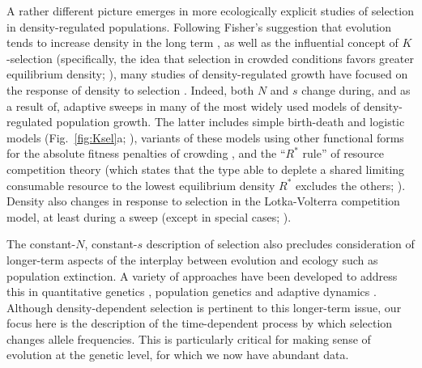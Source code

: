 \documentclass[12pt]{article}
\begin{document}
A rather different picture emerges in more ecologically explicit studies of selection in density-regulated populations. Following Fisher's suggestion that evolution tends to increase density in the long term \citep{fisher_1930, leon_1978, lande_2009}, as well as the influential concept of $K$-selection (specifically, the idea that selection in crowded conditions favors greater equilibrium density; \citealt{macarthur_1962}), many studies of density-regulated growth have focused on the response of density to selection \citep{kostitzin_1939,macarthur_1967,roughgarden_1979,christiansen_2004}. Indeed, both $N$ and $s$ change during, and as a result of, adaptive sweeps in many of the most widely used models of density-regulated population growth. The latter includes simple birth-death \citep{kostitzin_1939} and logistic models (Fig.~\ref{fig:Ksel}a; \citealt{macarthur_1962,roughgarden_1979,boyce_1984}), variants of these models using other functional forms for the absolute fitness penalties of crowding \citep{kimura_1978,charlesworth_1971,lande_2009,nagylaki_1979,lande_2009}, and the ``$R^*$ rule'' of resource competition theory (which states that the type able to deplete a shared limiting consumable resource to the lowest equilibrium density $R^*$ excludes the others; \citealt{grover_1997}). Density also changes in response to selection in the Lotka-Volterra competition model, at least during a sweep (except in special cases; \citealt{gill_1974,smouse_1976,mallet_2012}).

The constant-$N$, constant-$s$ description of selection also precludes consideration of longer-term aspects of the interplay between evolution and ecology such as population extinction. A variety of approaches have been developed to address this in quantitative genetics \citep{burger1995evolution,engen_2013}, population genetics \citep{bertram2017predicting} and adaptive dynamics \citep{ferriere2013eco,dieckmann2004adaptive}. Although density-dependent selection is pertinent to this longer-term issue, our focus here is the description of the time-dependent process by which selection changes allele frequencies. This is particularly critical for making sense of evolution at the genetic level, for which we now have abundant data.
\end{document}
